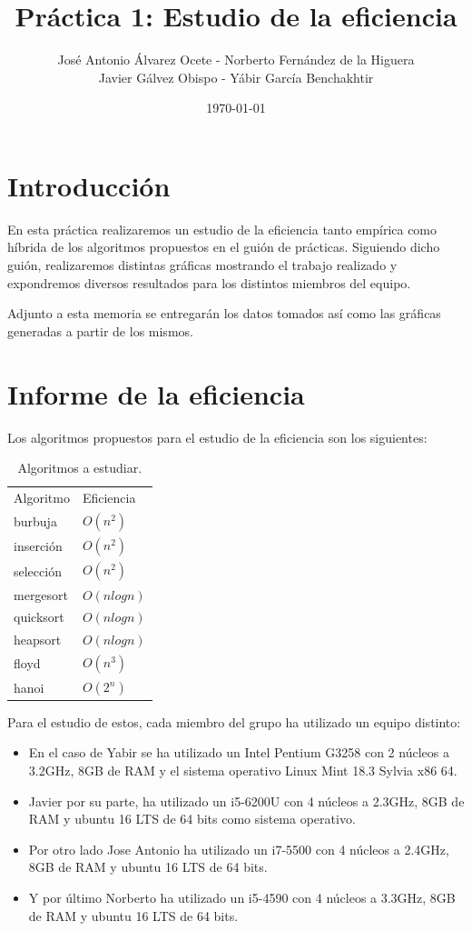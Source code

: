 \documentclass[11pt,a4paper]{article}
\title{Práctica 1: Estudio de la eficiencia}
\author{José Antonio Álvarez Ocete - Norberto Fernández de la Higuera \\ Javier Gálvez Obispo - Yábir García Benchakhtir }
\date{\today}
\begin{document}
\maketitle

\section{Introducción}

En esta práctica realizaremos un estudio de la eficiencia tanto empírica como híbrida de los algoritmos propuestos en el guión de prácticas. Siguiendo dicho guión, realizaremos distintas gráficas mostrando el trabajo realizado y expondremos diversos resultados para los distintos miembros del equipo.

Adjunto a esta memoria se entregarán los datos tomados así como las gráficas generadas a partir de los mismos.

\section{Informe de la eficiencia}

Los algoritmos propuestos para el estudio de la eficiencia son los siguientes:

\begin{table}[H]
	\centering
	\caption{Algoritmos a estudiar.}
	\label{my-label}
	\begin{tabular}{ll}
		Algoritmo & Eficiencia   \\
		burbuja   & $O(n^2)$     \\
		inserción & $O(n^2)$     \\
		selección & $O(n^2)$     \\
		mergesort & $O(n log n)$ \\
		quicksort & $O(n log n)$ \\
		heapsort  & $O(n log n)$ \\
		floyd     & $O(n^3)$     \\
		hanoi     & $O(2^n)$
	\end{tabular}
\end{table}

Para el estudio de estos, cada miembro del grupo ha utilizado un equipo distinto:

\begin{itemize}
\item En el caso de Yabir se ha utilizado un Intel Pentium G3258 con 2 núcleos a 3.2GHz,
  8GB de RAM y el sistema operativo Linux Mint 18.3 Sylvia x86 64.
\item Javier por su parte, ha utilizado un i5-6200U con 4 núcleos a 2.3GHz, 8GB de RAM
y ubuntu 16 LTS de 64 bits como sistema operativo.
\item Por otro lado Jose Antonio ha utilizado un i7-5500 con 4 núcleos a 2.4GHz, 8GB de RAM
  y ubuntu 16 LTS de 64 bits.
\item Y por último Norberto ha utilizado un i5-4590 con 4 núcleos a 3.3GHz, 8GB de RAM y
ubuntu 16 LTS de 64 bits.
  
\end{itemize}
\end{document}
